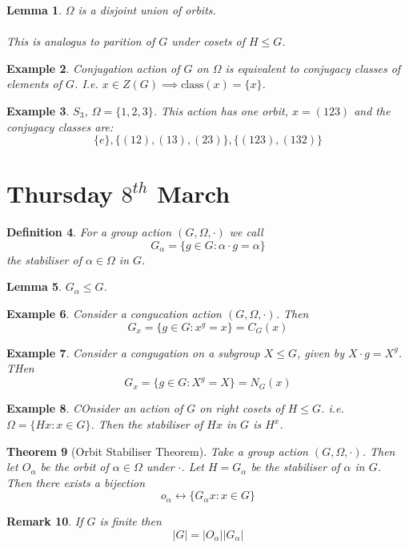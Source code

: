 \documentclass[a4paper,10pt]{article}
\newtheorem{thm}{Theorem}
\newtheorem{Def}[thm]{Definition}
\newtheorem{eg}[thm]{Example}
\newtheorem{Lem}[thm]{Lemma}
\newtheorem{rem}[thm]{Remark}
\begin{document}
\begin{Lem}
$\Omega$ is a disjoint union of orbits. \\
\\
This is analogus to parition of $G$ under cosets of $H \leq G$.
\end{Lem}

\begin{eg}
Conjugation action of $G$ on $\Omega$ is equivalent to conjugacy classes of elements of $G$. I.e. $x \in Z(G) \implies \text{class}(x) = \{x\}$.
\end{eg}

\begin{eg}
$S_3$, $\Omega = \{1,2,3\}$. This action has one orbit, $x = (123)$ and the conjugacy classes are:
\[ \{ e\}, \{ (12),(13),(23) \}, \{ (123),(132) \} \]
\end{eg}

\newpage
\section{Thursday $8^{th}$ March}


\begin{Def}
For a group action $(G , \Omega, \cdot)$ we call
\[ G_\alpha = \{ g \in G : \alpha \cdot g = \alpha \} \]
the stabiliser of $\alpha \in \Omega$ in $G$. 
\end{Def}

\begin{Lem}
$G_\alpha \leq G$. 
\end{Lem}

\begin{eg}
Consider a congucation action $(G, \Omega, \cdot)$. Then 
\[ G_x = \{ g \in G : x^g = x \} = C_G(x) \]
\end{eg}

\begin{eg}
Consider a congugation on a subgroup $X \leq G$, given by $X \cdot g = X^g$. THen
\[ G_x = \{ g \in G : X^g = X \} = N_G(x) \]
\end{eg}

\begin{eg}
COnsider an action of $G$ on right cosets of $H \leq G$. i.e. $\Omega = \{ Hx : x \in G\}$. Then the stabiliser of $Hx$ in $G$ is $H^x$. 
\end{eg}


\begin{thm}[Orbit Stabiliser Theorem]
Take a group action $(G, \Omega, \cdot)$. Then let $O_\alpha$ be the orbit of $\alpha \in \Omega$ under $\cdot$. Let $H = G_\alpha$ be the stabiliser of $\alpha$ in $G$. Then there exists a bijection
\[ o_\alpha \leftrightarrow \{ G_\alpha x : x \in G \} \] 
\end{thm}
\begin{rem}
If $G$ is finite then 
\[ |G| = |O_\alpha| | G_\alpha| \]
\end{rem}
\end{document}
